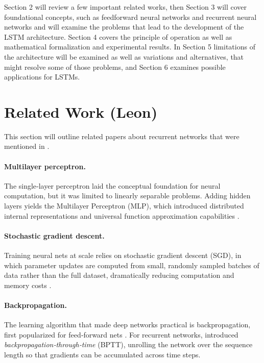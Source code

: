 \documentclass[twoside,a4paper,10pt,DIV=12,BCOR=12mm]{scrartcl}
\begin{document}
Section 2 will review a few important related works, then Section 3 will cover foundational concepts, such as feedforward neural networks and recurrent neural networks and will examine the problems that lead to the development of the LSTM architecture. Section 4 covers the principle of operation as well as mathematical formalization and experimental results.  In Section 5 limitations of the architecture will be examined as well as variations and alternatives, that might resolve some of those problems, and Section 6 examines possible applications for LSTMs.\\

\section{Related Work (Leon)}

This section will outline related papers about recurrent networks that were mentioned in \cite{hochreiter1997lstm}.


\paragraph{Multilayer perceptron.} The single‐layer perceptron \cite{Rosenblatt58} laid the conceptual 
foundation for neural computation, but it was limited to linearly separable problems. Adding hidden layers yields the
Multilayer Perceptron (MLP), which introduced distributed internal representations and universal function approximation capabilities \cite{Hornik89}.

\paragraph{Stochastic gradient descent.} Training neural nets at scale relies on stochastic gradient descent (SGD), in which 
parameter updates are computed from small, randomly sampled batches of data rather than the full dataset, dramatically reducing computation and memory costs \cite{Bottou10}.

\paragraph{Backpropagation.}
 The learning algorithm that made deep networks practical is backpropagation, first popularized for 
 feed‑forward nets \cite{Rumelhart86}.  For recurrent networks, 
 \cite{werb1990bptt} introduced \emph{backpropagation‑through‑time} (BPTT), unrolling the 
 network over the sequence length so that gradients can be accumulated across time steps.
\end{document}
